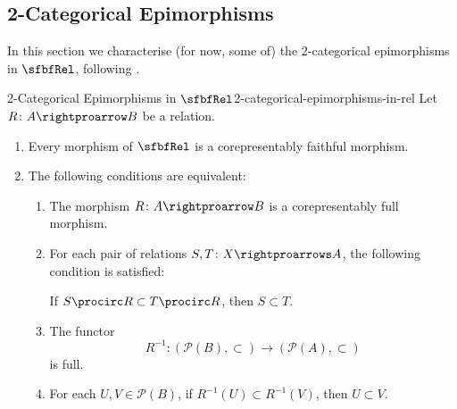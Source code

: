 \subsection{2-Categorical Epimorphisms}\label{subsection-2-categorical-epimorphisms-in-rel}
In this section we characterise (for now, some of) the 2-categorical epimorphisms in $\sfbfRel$, following .
\begin{proposition}{2-Categorical Epimorphisms in $\sfbfRel$}{2-categorical-epimorphisms-in-rel}%
    Let $R\colon A\rightproarrow B$ be a relation.
    \begin{enumerate}
        \item\label{2-categorical-epimorphisms-in-rel-corepresentably-faithful-morphisms-in-rel}Every morphism of $\sfbfRel$ is a corepresentably faithful morphism.
        \item\label{2-categorical-epimorphisms-in-rel-corepresentably-full-morphisms-in-rel}The following conditions are equivalent:
            \begin{enumerate}
                \item\label{2-categorical-epimorphisms-in-rel-corepresentably-full-morphisms-in-rel-1}The morphism $R\colon A\rightproarrow B$ is a corepresentably full morphism.
                \item\label{2-categorical-epimorphisms-in-rel-corepresentably-full-morphisms-in-rel-2}For each pair of relations $S,T\colon X\rightproarrows A$, the following condition is satisfied:
                    \begin{itemize}
                        \itemstar If $S\procirc R\subset T\procirc R$, then $S\subset T$.
                    \end{itemize}
                \item\label{2-categorical-epimorphisms-in-rel-corepresentably-full-morphisms-in-rel-3}The functor
                    \[
                        R^{-1}%
                        \colon%
                        (\mathcal{P}(B),\subset)%
                        \to%
                        (\mathcal{P}(A),\subset)%
                    \]%
                    is full.
                \item\label{2-categorical-epimorphisms-in-rel-corepresentably-full-morphisms-in-rel-4}For each $U,V\in\mathcal{P}(B)$, if $R^{-1}(U)\subset R^{-1}(V)$, then $U\subset V$.

\end{enumerate}
\end{enumerate}
\end{proposition}
